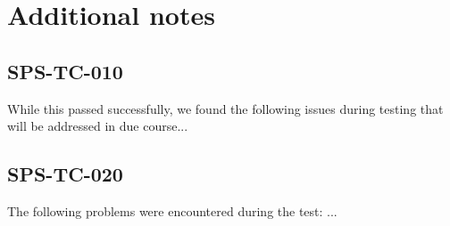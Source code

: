 \section{Additional notes}

\subsection{SPS-TC-010}
\label{sec:tc-010}

While this passed successfully, 
we found the following issues during testing 
that will be addressed in due course...

\subsection{SPS-TC-020}
\label{sec:tc-020}

The following problems were encountered during the test: ...